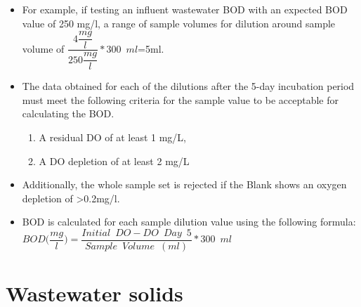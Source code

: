 \begin{itemize}
\item For example, if testing an influent wastewater BOD with an expected BOD value of 250 mg/l, a range of sample volumes for dilution around sample volume of $\dfrac{4\dfrac{mg}{l}}{250 \dfrac{mg}{l}}*300 \enspace ml$=5ml.\\
\vspace{0.4cm}
\item The data obtained for each of the dilutions after the 5-day incubation period must meet the following criteria for the sample value to be acceptable for calculating the BOD.\\
\vspace{0.4cm}

\begin{enumerate}[1.]
\setlength\itemsep{1em}

\item A residual DO of at least 1 mg/L,
\item A DO depletion of at least 2 mg/L
\end{enumerate}
\vspace{0.4cm}
\item Additionally, the whole sample set is rejected if the Blank shows an oxygen depletion of >0.2mg/l.\\
\vspace{0.4cm}
\item BOD is calculated for each sample dilution value using the following formula:\\
\vspace{0.4cm}
\textbf{$BOD \Big(\dfrac{mg}{l}\Big) = \dfrac{Initial \enspace DO - DO \enspace Day \enspace 5}{Sample \enspace Volume \enspace (ml)}*300 \enspace ml$}\\



\end{itemize}
\vspace{0.4cm}
\section{Wastewater solids}

